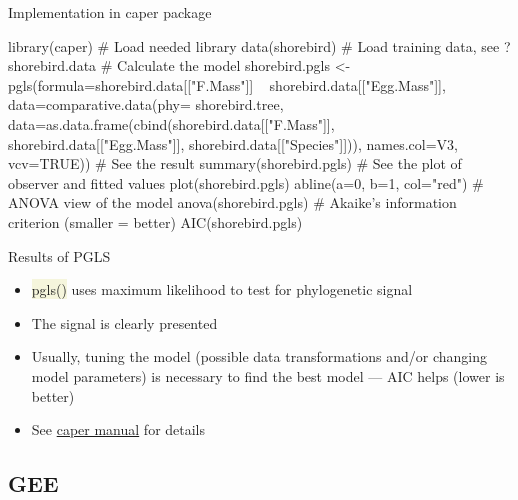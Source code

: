 \documentclass[compress, ucs, xelatex, 11pt, xcolor=svgnames, aspectratio=169,
	hyperref={
		bookmarks=true,
		unicode=true,
		colorlinks=true,
		pdftitle={Molecular data in R},
		plainpages=false,
		pdfauthor={Vojtech Zeisek},
		pdfsubject={Course about phylogeny and evolution in R},
		pdfcreator={XeLaTeX},
		pdfkeywords={R, evolution, phylogeny, molecular data},
		linkcolor=Crimson, %
		anchorcolor=Magenta, %
		citecolor=Magenta, %
		filecolor=Magenta, %
		menucolor=Magenta, %
		urlcolor=DodgerBlue, %
		pdftex},
	url={hyphens, lowtilde} %
	]{beamer}
\renewcommand{\texttt}[1]{\colorbox{Beige}{{\ttfamily #1}}}
\begin{document}
\begin{frame}[fragile]{Implementation in caper package}
	\begin{spluscode}
    library(caper) # Load needed library
    data(shorebird) # Load training data, see ?shorebird.data
    # Calculate the model
    shorebird.pgls <- pgls(formula=shorebird.data[["F.Mass"]] ~
      shorebird.data[["Egg.Mass"]], data=comparative.data(phy=
      shorebird.tree, data=as.data.frame(cbind(shorebird.data[["F.Mass"]],
      shorebird.data[["Egg.Mass"]], shorebird.data[["Species"]])),
      names.col=V3, vcv=TRUE))
    # See the result
    summary(shorebird.pgls)
    # See the plot of observer and fitted values
    plot(shorebird.pgls)
    abline(a=0, b=1, col="red")
    # ANOVA view of the model
    anova(shorebird.pgls)
    # Akaike's information criterion (smaller = better)
    AIC(shorebird.pgls)
	\end{spluscode}
\end{frame}

\begin{frame}{Results of PGLS}
	\begin{multicols}{2}
		\begin{center}
			\texttt{[image: shorebirds.png]}
		\end{center}
		\begin{itemize}
			\item \texttt{pgls()} uses maximum likelihood to test for phylogenetic signal
			\item The signal is clearly presented
			\item Usually, tuning the model (possible data transformations and/or changing model parameters) is necessary to find the best model --- AIC helps (lower is better)
			\item See \href{https://CRAN.R-project.org/package=caper}{caper manual} for details
		\end{itemize}
	\end{multicols}
\end{frame}

\subsection{GEE}
\end{document}
